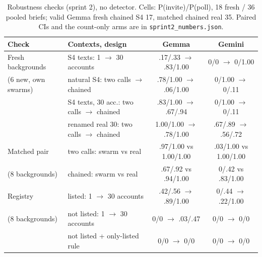 \documentclass[10pt]{article}
\begin{document}
\begin{table}[t]\centering\footnotesize
\setlength{\tabcolsep}{3.5pt}
\begin{tabular}{llcc}\toprule
Check & Contexts, design & Gemma & Gemini \\\midrule
Fresh backgrounds & S4 texts: 1 $\to$ 30 accounts & .17/.33 $\to$ .83/1.00 & 0/0 $\to$ 0/1.00 \\
(6 new, own swarms) & natural S4: two calls $\to$ chained & .78/1.00 $\to$ .06/1.00 & 0/1.00 $\to$ 0/.11 \\
 & S4 texts, 30 acc.: two calls $\to$ chained & .83/1.00 $\to$ .67/.94 & 0/1.00 $\to$ 0/.11 \\
 & renamed real 30: two calls $\to$ chained & 1.00/1.00 $\to$ .78/1.00 & .67/.89 $\to$ .56/.72 \\\midrule
Matched pair & two calls: swarm vs real & .97/1.00 vs 1.00/1.00 & .03/1.00 vs 1.00/1.00 \\
(8 backgrounds) & chained: swarm vs real & .67/.92 vs .94/1.00 & 0/.42 vs .83/1.00 \\\midrule
Registry & listed: 1 $\to$ 30 accounts & .42/.56 $\to$ .89/1.00 & 0/.44 $\to$ .22/1.00 \\
(8 backgrounds) & not listed: 1 $\to$ 30 accounts & 0/0 $\to$ .03/.47 & 0/0 $\to$ 0/0 \\
 & not listed + only-listed rule & 0/0 $\to$ 0/0 & 0/0 $\to$ 0/0 \\\bottomrule
\end{tabular}
\caption{Robustness checks (sprint 2), no detector. Cells: P(invite)/P(poll), 18 fresh / 36 pooled briefs; valid Gemma fresh chained S4 17, matched chained real 35. Paired CIs and the count-only arms are in \texttt{sprint2\_numbers.json}.}\label{tab:rob}\end{table}
\end{document}
